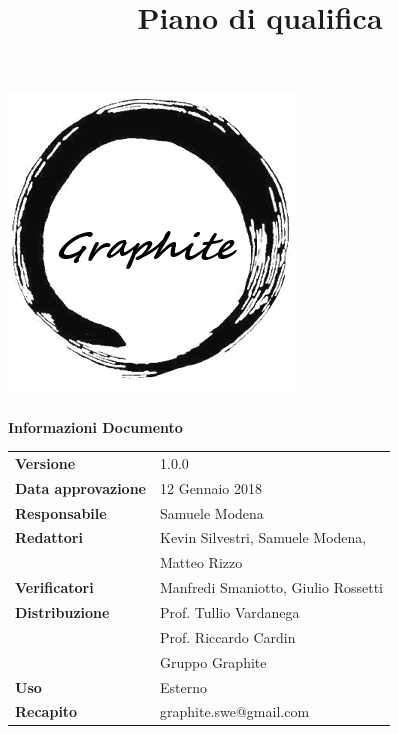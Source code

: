 \documentclass[openany,12pt,a4paper]{report}
\title{Piano di qualifica}
\author{}
\newcommand{\versione}{1.0.0}
\begin{document}
	\makeatletter
	\begin{titlepage}
		\setlength{\headsep}{0pt}  
		\begin{center}
			\includegraphics[width=0.5\linewidth]{img/logo.png}\\[1em]
			{\huge \bfseries  \@title }\\[10ex]
			\textbf{\Large Informazioni Documento} \\[2em]
			\bgroup
			\def\arraystretch{1.5}
			\begin{tabular}{l|l}
				\textbf{Versione} & \versione{} \\
				\textbf{Data approvazione} & 12 Gennaio 2018 \\
				\textbf{Responsabile} & Samuele Modena\\
				\textbf{Redattori} &  Kevin Silvestri, Samuele Modena,\\
				& Matteo Rizzo \\
				\textbf{Verificatori} & Manfredi Smaniotto, Giulio Rossetti \\
				\textbf{Distribuzione} & Prof. Tullio Vardanega \\
				 & Prof. Riccardo Cardin \\
				 & Gruppo Graphite \\
				\textbf{Uso} & Esterno \\
				\textbf{Recapito} & graphite.swe@gmail.com \\
			\end{tabular}
		\egroup
		\end{center}
	\end{titlepage}
	\makeatother
 
\thispagestyle{empty}
\newpage

\end{document}

